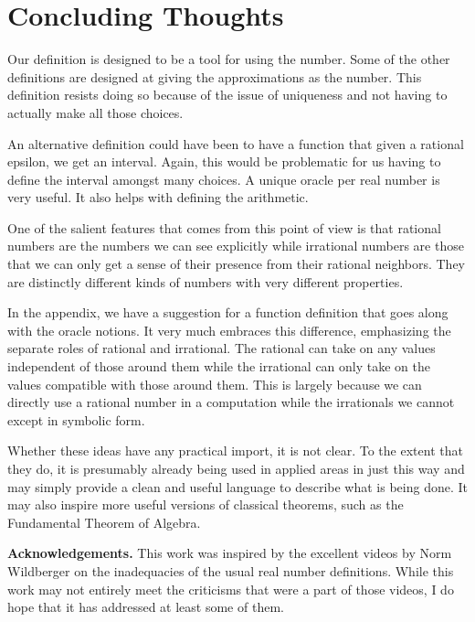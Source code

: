 \documentclass[12pt]{article}
\theoremstyle{remark}
\begin{document}
\section{Concluding Thoughts}

Our definition is designed to be a tool for using the number. Some of the other definitions are designed at giving the approximations as the number. This definition resists doing so because of the issue of uniqueness and not having to actually make all those choices. 

An alternative definition could have been to have a function that given a rational epsilon, we get an interval. Again, this would be problematic for us having to define the interval amongst many choices. A unique oracle per real number is very useful. It also helps with defining the arithmetic. 

One of the salient features that comes from this point of view is that rational numbers are the numbers we can see explicitly while irrational numbers are those that we can only get a sense of their presence from their rational neighbors. They are distinctly different kinds of numbers with very different properties. 

In the appendix, we have a suggestion for a function definition that goes along with the oracle notions. It very much embraces this difference, emphasizing the separate roles of rational and irrational. The rational can take on any values independent of those around them while the irrational can only take on the values compatible with those around them. This is largely because we can directly use a rational number in a computation while the irrationals we cannot except in symbolic form. 

Whether these ideas have any practical import, it is not clear. To the extent that they do, it is presumably already being used in applied areas in just this way and may simply provide a clean and useful language to describe what is being done. It may also inspire more useful versions of classical theorems, such as the Fundamental Theorem of Algebra. 

\bigskip

\noindent \textbf{Acknowledgements. } This work was inspired by the excellent videos by Norm Wildberger on the inadequacies of the usual real number definitions. While this work may not entirely meet the criticisms that were a part of those videos, I do hope that it has addressed at least some of them. 

\appendix
\end{document}

